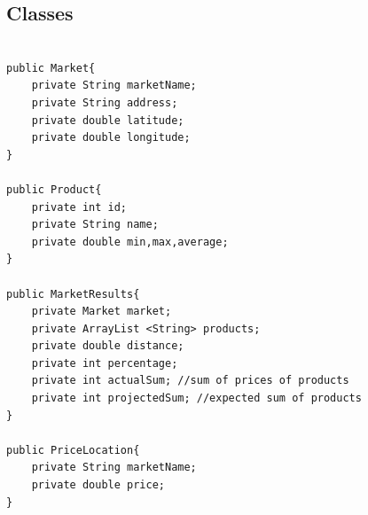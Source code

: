 \documentclass[a4paper,10pt]{report}
\begin{document}
\subsection{Classes}

\begin{verbatim}

public Market{
    private String marketName;
    private String address;
    private double latitude;
    private double longitude;
}

public Product{
    private int id;
    private String name;
    private double min,max,average;
}

public MarketResults{
    private Market market;
    private ArrayList <String> products;
    private double distance;
    private int percentage;
    private int actualSum; //sum of prices of products
    private int projectedSum; //expected sum of products
}

public PriceLocation{
    private String marketName;
    private double price;
}

\end{verbatim}
\end{document}
